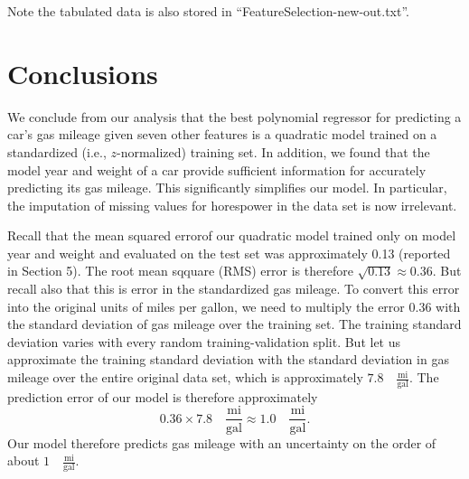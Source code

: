 \documentclass[12pt]{article}
\begin{document}
Note the tabulated data is also stored in ``FeatureSelection-new-out.txt''.

\section{Conclusions}

We conclude from our analysis that the best polynomial regressor for predicting a car's gas mileage given seven other features is a quadratic model trained on a standardized (i.e., $z$-normalized) training set. In addition, we found that the model year and weight of a car provide sufficient information for accurately predicting its gas mileage. This significantly simplifies our model. In particular, the imputation of missing values for horespower in the data set is now irrelevant.

Recall that the mean squared errorof our quadratic model trained only on model year and weight and evaluated on the test set was approximately 0.13 (reported in Section 5). The root mean sqquare (RMS) error is therefore $\sqrt{0.13}\approx 0.36$. But recall also that this is error in the standardized gas mileage. To convert this error into the original units of miles per gallon, we need to multiply the error $0.36$ with the standard deviation of gas mileage over the training set. The training standard deviation varies with every random training-validation split. But let us approximate the training standard deviation with the standard deviation in gas mileage over the entire original data set, which is approximately $7.8\quad\frac{\mbox{mi}}{\mbox{gal}}$. The prediction error of our model is therefore approximately
\[ 0.36\times 7.8\quad\frac{\mbox{mi}}{\mbox{gal}} \approx 1.0 \quad\frac{\mbox{mi}}{\mbox{gal}}. \]
Our model therefore predicts gas mileage with an uncertainty on the order of about $1\quad\frac{\mbox{mi}}{\mbox{gal}}$.
\end{document}
